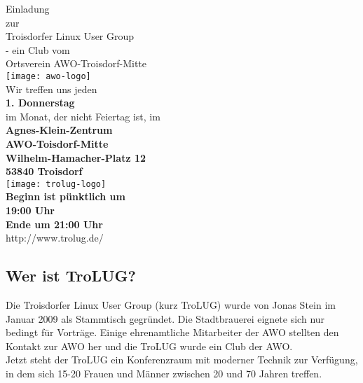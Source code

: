 \documentclass[a4paper,11pt,notumble]{leaflet}
\begin{document}
 
\newenvironment{pandora}{\fontfamily{pnb10}\selectfont}{}
\newenvironment{panfett}{\fontfamily{pnss10}\selectfont}{}
\newenvironment{ebmr}{\fontfamily{ebmr10}\selectfont}{}
\newenvironment{anb}{\fontfamily{anb10u}\selectfont}{}
\setlength{\fboxsep}{0.2cm}  %
\setlength{\parindent}{0pt}  %

\newcommand{\VT}[3]{{\tt #1} \textsl{#2} {\bf #3}\\[2mm]}



\begin{center}
\Huge{\sc Einladung}\\[3mm]
{\small zur}\\[1mm]
\large{\sc Troisdorfer Linux User Group}\\[1mm]
{\small - ein Club vom}\\[1mm]
\large{\sc Ortsverein AWO-Troisdorf-Mitte} \\[1mm] 
  \texttt{[image: awo-logo]}\\[5mm]
{\large Wir treffen uns jeden} \\[0mm]

  \textbf{\Huge{1. Donnerstag\\[2mm] }} %
  im Monat, der nicht Feiertag ist, im\\[5mm]
 \textbf{\sc Agnes-Klein-Zentrum\\[2mm]
AWO-Toisdorf-Mitte\\
Wilhelm-Hamacher-Platz 12\\
53840 Troisdorf\\[5mm]}
 \texttt{[image: trolug-logo]}\\[4mm]
\textbf{\large{Beginn ist pünktlich um\\[1mm]}}
\textbf{\Huge{19:00 Uhr}} \\[1mm]
\textbf{\large{Ende um 21:00 Uhr}}\\[2mm]
\textsf{\large http://www.trolug.de/ }\\[2mm]
\end{center}

\vfill
\subsection{Wer ist TroLUG?}
Die {\sc Troisdorfer Linux User Group} (kurz TroLUG) wurde von Jonas Stein im Januar 2009 als Stammtisch gegründet. 
Die Stadtbrauerei eignete sich nur bedingt für Vorträge. Einige ehrenamtliche Mitarbeiter der AWO stellten den Kontakt zur AWO her und die TroLUG wurde ein Club der AWO.\\
Jetzt steht der TroLUG ein Konferenzraum mit moderner Technik zur Verfügung, in dem sich 15-20 Frauen und Männer zwischen 20 und 70 Jahren treffen.
\end{document}
